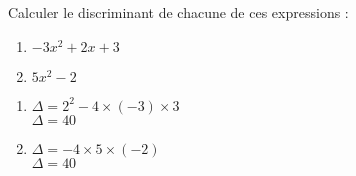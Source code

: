 \documentclass[a4paper,11pt,exos]{nsi} %
\begin{document}

\maketitle

\begin{exercice}
    Calculer le discriminant de chacune de ces expressions :
    \begin{multicols}{2}
        \begin{enumerate}
            \item $-3x^2+2x+3$
        
            \item $5x^2-2$
        \end{enumerate}
    \end{multicols}
    
    \end{exercice}

    \begin{multicols}{2}
        \begin{enumerate}
            \item$\Delta = 2^2-4\times\left(-3\right)\times3$\\
                $\Delta=40$
        
            \item $\Delta = -4\times5\times\left(-2\right)$\\
            $\Delta=40$
        \end{enumerate}
    \end{multicols}
\end{document}
